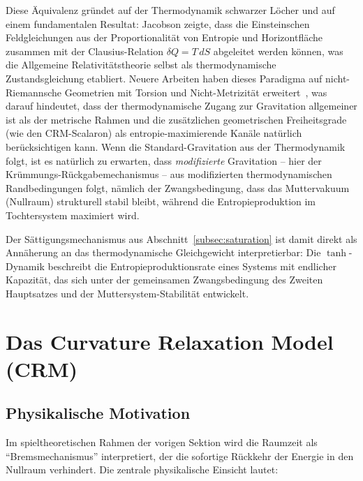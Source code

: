 \documentclass[aps,prd,twocolumn,superscriptaddress,nofootinbib]{revtex4-2}
\begin{document}
Diese Äquivalenz gründet auf der Thermodynamik schwarzer Löcher \cite{Hawking1974} und auf einem fundamentalen Resultat: Jacobson \cite{Jacobson1995} zeigte, dass die Einsteinschen Feldgleichungen aus der Proportionalität von Entropie und Horizontfläche zusammen mit der Clausius-Relation $\delta Q = T\,dS$ abgeleitet werden können, was die Allgemeine Relativitätstheorie selbst als thermodynamische Zustandsgleichung etabliert. Neuere Arbeiten haben dieses Paradigma auf nicht-Riemannsche Geometrien mit Torsion und Nicht-Metrizität erweitert~\cite{JacobsonNonRiemannian2026}, was darauf hindeutet, dass der thermodynamische Zugang zur Gravitation allgemeiner ist als der metrische Rahmen und die zusätzlichen geometrischen Freiheitsgrade (wie den CRM-Scalaron) als entropie-maximierende Kanäle natürlich berücksichtigen kann. Wenn die Standard-Gravitation aus der Thermodynamik folgt, ist es natürlich zu erwarten, dass \textit{modifizierte} Gravitation -- hier der Krümmungs-Rückgabemechanismus -- aus modifizierten thermodynamischen Randbedingungen folgt, nämlich der Zwangsbedingung, dass das Muttervakuum (Nullraum) strukturell stabil bleibt, während die Entropieproduktion im Tochtersystem maximiert wird.

Der Sättigungsmechanismus aus Abschnitt~\ref{subsec:saturation} ist damit direkt als Annäherung an das thermodynamische Gleichgewicht interpretierbar: Die $\tanh$-Dynamik beschreibt die Entropieproduktionsrate eines Systems mit endlicher Kapazität, das sich unter der gemeinsamen Zwangsbedingung des Zweiten Hauptsatzes und der Muttersystem-Stabilität entwickelt.

\section{Das Curvature Relaxation Model (CRM)}
\label{sec:crm}

\subsection{Physikalische Motivation}
\label{subsec:motivation}

Im spieltheoretischen Rahmen der vorigen Sektion wird die Raumzeit als ``Bremsmechanismus'' interpretiert, der die sofortige Rückkehr der Energie in den Nullraum verhindert. Die zentrale physikalische Einsicht lautet:
\end{document}
